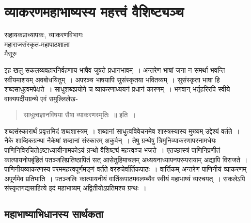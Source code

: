 {\fontsize{15}{17}\selectfont
\presetvalues
\chapter{व्याकरणमहाभाष्यस्य महत्त्वं वैशिष्ट्यञ्च}

\begin{center}
\smallskip

सहायकप्राध्यापकः, व्याकरणविभागः\\
महाराजसंस्कृत-महापाठशाला\\
मैसूरु
\addrule
\end{center}
 	
इह खलु सकलव्यवहारनिर्वहणाय भाषैव जुषते प्रधानभावम्~। अन्तरेण भाषां जना न समर्था भवन्ति स्वीयमाशयम् अवबोधयितुम्~। अपरञ्च भाषयापि सुसंस्कृतया भवितव्यम्~। सुसंस्कृता भाषा हि शब्दसाधुत्वमपेक्षते~। साधुशब्दप्रयोगे च व्याकरणाध्ययनं प्रधानं कारणम्~। भगवान् भर्तृहरिरपि स्वीये वाक्यपदीयग्रन्थे एवं समुल्लिलेख-
\begin{verse}
साधुत्वज्ञानविषया सैषा व्याकरणस्मृतिः~॥ इति~। 
\end{verse}
शब्दसंस्कारार्थं प्रवृत्तमिदं शब्दशास्त्रम्~। शब्दानां साधुत्वविवेचनमेव शास्त्रस्यास्य मुख्यम् \break उद्देश्यं वर्तते~। नैके शाब्दिकग्रन्था नैकेषां शब्दानां संस्कारम् अकुर्वन्~। तेषु ग्रन्थेषु त्रिमुनि\-व्याकरणापरनामधेयः पाणिनिविरचितोऽष्टाध्यायीनामकोऽयं ग्रन्थो वैशिष्ट्यं महत्त्वञ्च \break भजते~। एतच्छास्त्रं पाणिनिप्रणीतं कात्यायनोपबृंहितं पतञ्जलिप्रतिष्ठापितं सत् आसेतुहि\-माचलम् अध्ययनाध्यापनपरम्परायाम् अद्यापि विराजते~। पाणिनीयव्याकरणस्य परम\break महत्त्वपूर्णमङ्गं वर्तते वररुचेर्वार्तिकपाठः~। वार्त्तिकम् अन्तरेण पाणिनीयं व्याकरणम् अपूर्णमेव प्रतिभाति~। पतञ्जलिः कात्यायनीयं वार्तिकपाठमवलम्ब्यैव स्वीयं महाभाष्यं व्यरचयत्~। सकलेऽपि संस्कृतगद्यसाहित्ये इदं महाभाष्यम् अद्वितीयोऽप्रतिमश्च ग्रन्थः~। 
~\\[-0.75cm]
\section*{महाभाष्याभिधानस्य सार्थकता}

}
